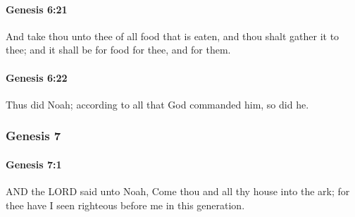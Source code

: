 		\paragraph{Genesis 6:21} %
			\label{GENESIS-6-21}

			And take thou unto thee of all food that is eaten, and thou shalt gather it to thee; and it shall be for food for thee, and for them.


		\paragraph{Genesis 6:22} %
			\label{GENESIS-6-22}

			Thus did Noah; according to all that God commanded him, so did he.


	\subsubsection{Genesis 7} %
		\label{GENESIS-7}
		
		\paragraph{Genesis 7:1} %
			\label{GENESIS-7-1}

			AND the LORD said unto Noah, Come thou and all thy house into the ark; for thee have I seen righteous before me in this generation.


